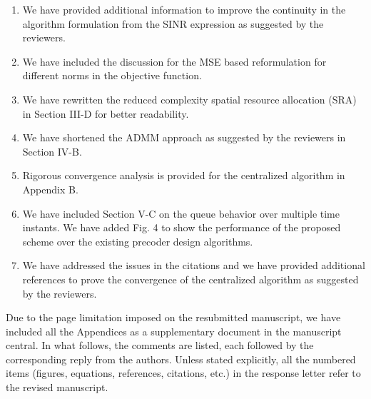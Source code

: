 \begin{enumerate}
\item We have provided additional information to improve the continuity in the algorithm formulation from the SINR expression as suggested by the reviewers.
\item We have included the discussion for the MSE based reformulation for different norms in the objective function.
\item We have rewritten the reduced complexity spatial resource allocation (SRA) in Section III-D for better readability.
\item We have shortened the ADMM approach as suggested by the reviewers in Section IV-B.
\item Rigorous convergence analysis is provided for the centralized algorithm in Appendix B.
\item We have included Section V-C on the queue behavior over multiple time instants. We have added Fig. 4 to show the performance of the proposed scheme over the existing precoder design algorithms.
\item We have addressed the issues in the citations and we have provided additional references to prove the convergence of the centralized algorithm as suggested by the reviewers.
\end{enumerate}

Due to the page limitation imposed on the resubmitted manuscript, we have included all the Appendices as a supplementary document in the manuscript central. In what follows, the comments are listed, each followed by the corresponding reply from the authors. Unless stated explicitly, all the numbered items (figures, equations, references, citations, etc.) in the response letter refer to the revised manuscript.
